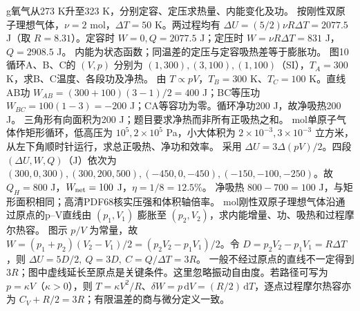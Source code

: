  g氧气从273 K升至323 K，分别定容、定压求热量、内能变化及功。
\workings 按刚性双原子理想气体，$\nu=2$ mol，$\Delta T=50$ K。两过程均有 $\Delta U=(5/2)\nu R\Delta T=2077.5$ J（取 $R=8.31$）。定容时 $W=0,Q=2077.5$ J；定压时 $W=\nu R\Delta T=831$ J，$Q=2908.5$ J。
\crosscheck 内能为状态函数；同温差的定压与定容吸热差等于膨胀功。
\problemtext 图10循环A、B、C的 $(V,p)$ 分别为 $(1,300),(3,100),(1,100)$（SI），$T_A=300$ K，求B、C温度、各段功及净热。
\workings 由 $T\propto pV$，$T_B=300$ K、$T_C=100$ K。直线AB功 $W_{AB}=(300+100)(3-1)/2=400$ J；BC等压功 $W_{BC}=100(1-3)=-200$ J；CA等容功为零。循环净功200 J，故净吸热200 J。
\crosscheck 三角形有向面积为200 J；题目要求净热而非所有正吸热之和。
 mol单原子气体作矩形循环，低高压为 $10^5,2\times10^5$ Pa，小大体积为 $2\times10^{-3},3\times10^{-3}$ 立方米，从左下角顺时针运行，求总正吸热、净功和效率。
\workings 采用 $\Delta U=3\Delta(pV)/2$。四段 $(\Delta U,W,Q)$（J）依次为 $(300,0,300),(300,200,500),(-450,0,-450),(-150,-100,-250)$。故 $Q_H=800$ J，$W_{\rm net}=100$ J，$\eta=1/8=12.5\%$。
\crosscheck 净吸热 $800-700=100$ J，与矩形面积相同；高清PDF68核实压强和体积轴倍率。
 mol刚性双原子理想气体沿通过原点的p--V直线由 $(p_1,V_1)$ 膨胀至 $(p_2,V_2)$，求内能增量、功、吸热和过程摩尔热容。
\workings 图示 $p/V$ 为常量，故 $W=(p_1+p_2)(V_2-V_1)/2=(p_2V_2-p_1V_1)/2$。令 $D=p_2V_2-p_1V_1=R\Delta T$，则 $\Delta U=5D/2,\ Q=3D,\ C=Q/\Delta T=3R$。
\crosscheck 一般不经过原点的直线不一定得到 $3R$；图中虚线延长至原点是关键条件。这里忽略振动自由度。若路径可写为 $p=\kappa V$（$\kappa>0$），则 $T=\kappa V^2/R$、$\delta W=p\,\mathrm dV=(R/2)\,\mathrm dT$，逐点过程摩尔热容亦为 $C_V+R/2=3R$；有限温差的商与微分定义一致。
